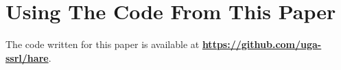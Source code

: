 \appendices
\section{Using The Code From This Paper}        %
The code written for this paper is available at
\textbf{\url{https://github.com/uga-ssrl/hare}}.

